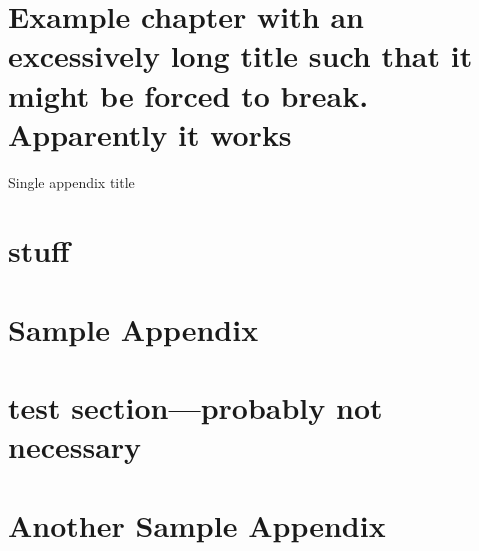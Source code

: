 \documentclass{ritthesis}
\providecommand{\chapter}[1]{\section{#1}}
\begin{document}
\chapter{Example chapter with an excessively long title such that it might be forced to break. Apparently it works}
\lipsum[8-12]

\nocite{cheung,zhao,cao,zhang}

\nocite{*}


\begin{theappendix}{Single appendix title}
	\section{stuff}
	\lipsum[15-21]
\end{theappendix}

\appendix

\chapter{Sample Appendix}

\section{test section---probably not necessary}
\lipsum[6-12]
\chapter{Another Sample Appendix}
\lipsum[10-11]

\end{document}
